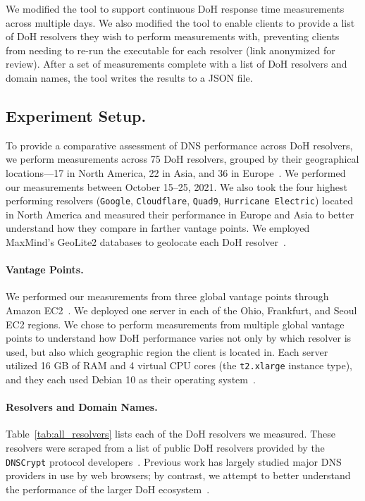 We modified the tool to support continuous DoH response time measurements
across multiple days.  We also modified the tool to enable clients to provide
a list of DoH resolvers they wish to perform measurements with, preventing
clients from needing to re-run the executable for each resolver (link
anonymized for review).  After a set of measurements complete with a list of
DoH resolvers and domain names, the tool writes the results to a JSON file.

\subsection{Experiment Setup.} To provide a comparative assessment of DNS
performance across DoH resolvers, we perform measurements across 75 DoH
resolvers, grouped by their geographical locations—17 in North America, 22 in
Asia, and 36 in Europe~\cite{dnscrypt}.  We performed our measurements between
October 15--25, 2021.  We also took the four highest
performing resolvers (\texttt{Google}, \texttt{Cloudflare}, \texttt{Quad9},
\texttt{Hurricane Electric}) located in North America and measured their
performance in Europe and Asia to better understand how they compare in
farther vantage points.  We employed MaxMind's GeoLite2 databases to geolocate
each DoH resolver~\cite{maxmind}.

\paragraph{Vantage Points.} We performed our measurements from three global
vantage points through Amazon EC2~\cite{amazon_ec2}.  We deployed one server
in each of the Ohio, Frankfurt, and Seoul EC2 regions.  We chose to perform
measurements from multiple global vantage points to understand how DoH
performance varies not only by which resolver is used, but also which
geographic region the client is located in.  Each server utilized 16 GB of RAM
and 4 virtual CPU cores (the \texttt{t2.xlarge} instance type), and they each
used Debian 10 as their operating system~\cite{amazon_ec2_instance_types}.

\paragraph{Resolvers and Domain Names.} Table~\ref{tab:all_resolvers} 
lists each of the DoH resolvers we measured.  These resolvers were
scraped from a list of public DoH resolvers provided by the \texttt{DNSCrypt}
protocol developers~\cite{dnscrypt-public-resolvers}.  Previous work has
largely studied major DNS providers in use by web browsers; by contrast, we
attempt to better understand the performance of the larger DoH
ecosystem~\cite{hounsel2020comparing,hounsel2021can,borgolte2019dns}.

